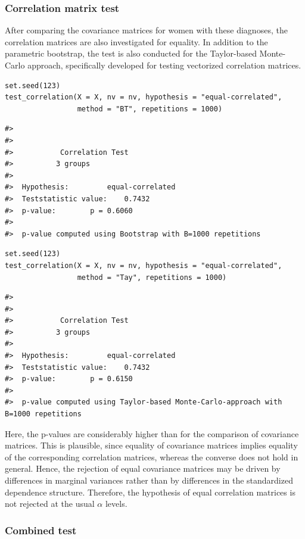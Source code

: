 \subsubsection{Correlation matrix test}\label{correlation-matrix-test}

After comparing the covariance matrices for women with these diagnoses, the correlation matrices are also investigated for equality. In addition to the parametric bootstrap, the test is also conducted for the Taylor-based Monte-Carlo approach, specifically developed for testing vectorized correlation matrices.

\begin{verbatim}
set.seed(123)
test_correlation(X = X, nv = nv, hypothesis = "equal-correlated",
                 method = "BT", repetitions = 1000)
\end{verbatim}

\begin{verbatim}
#> 
#> 
#>           Correlation Test 
#>          3 groups
#> 
#>  Hypothesis:         equal-correlated
#>  Teststatistic value:    0.7432
#>  p-value:        p = 0.6060
#>  
#>  p-value computed using Bootstrap with B=1000 repetitions
\end{verbatim}

\begin{verbatim}
set.seed(123)
test_correlation(X = X, nv = nv, hypothesis = "equal-correlated",
                 method = "Tay", repetitions = 1000)
\end{verbatim}

\begin{verbatim}
#> 
#> 
#>           Correlation Test 
#>          3 groups
#> 
#>  Hypothesis:         equal-correlated
#>  Teststatistic value:    0.7432
#>  p-value:        p = 0.6150
#>  
#>  p-value computed using Taylor-based Monte-Carlo-approach with B=1000 repetitions
\end{verbatim}

Here, the p-values are considerably higher than for the comparison of covariance matrices. This is plausible, since equality of covariance matrices implies equality of the corresponding correlation matrices, whereas the converse does not hold in general. Hence, the rejection of equal covariance matrices may be driven by differences in marginal variances rather than by differences in the standardized dependence structure. Therefore, the hypothesis of equal correlation matrices is not rejected at the usual \(\alpha\) levels.

\subsubsection{Combined test}\label{combined-test}

